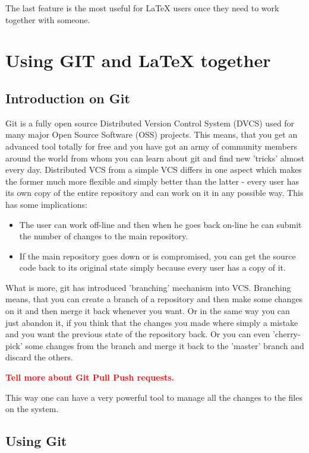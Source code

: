 The last feature is the most useful for \LaTeX{} users once they need to work
together with someone.

\section{Using GIT and \LaTeX{} together}

\subsection{Introduction on Git}

Git is a fully open source Distributed Version Control System (DVCS) used for
many major Open Source Software (OSS) projects.
%
This means, that you get an advanced tool totally for free and you have got an
army of community members around the world from whom you can learn about git and
find new 'tricks' almost every day.
%
Distributed VCS from a simple VCS differs in one aspect which makes the former
much more flexible and simply better than the latter - every user has its own
copy of the entire repository and can work on it in any possible way.
%
This has some implications:
\begin{itemize}
    \item The user can work off-line and then when he goes back on-line he can
        submit the number of changes to the main repository.
    \item If the main repository goes down or is compromised, you can get the
        source code back to its original state simply because every user has a
        copy of it.
\end{itemize}



What is more, git has introduced 'branching' mechanism into VCS.
%
Branching means, that you can create a branch of a repository and then make some
changes on it and then merge it back whenever you want.
%
Or in the same way you can just abandon it, if you think that the changes you
made where simply a mistake and you want the previous state of the repository
back.
%
Or you can even 'cherry-pick' some changes from the branch and merge it back to
the 'master' branch and discard the others.


\textcolor{Red}{\bfseries 
    Tell more about Git Pull Push requests.
}

This way one can have a very powerful tool to manage all the changes to the
files on the system.

\subsection{Using Git}


